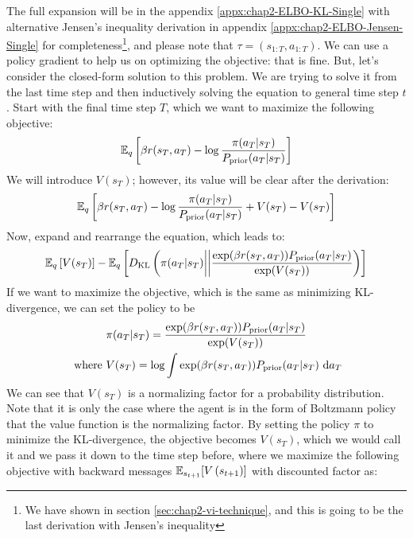 The full expansion will be in the appendix \ref{appx:chap2-ELBO-KL-Single} with alternative Jensen's inequality derivation in appendix \ref{appx:chap2-ELBO-Jensen-Single} for completeness\footnote{We have shown in section \ref{sec:chap2-vi-technique}, and this is going to be the last derivation with Jensen's inequality}, and please note that $\tau = (s_{1:T}, a_{1:T})$. We can use a policy gradient to help us on optimizing the objective: that is fine. But, let's consider the closed-form solution to this problem. We are trying to solve it from the last time step and then inductively solving the equation to general time step $t$. Start with the final time step $T$, which we want to maximize the following objective:
\begin{equation}
    \mathbb{E}_{q} \left[\beta r(s_T, a_T) - \log \frac{\pi(a_T | s_T)}{P_{\text{prior}}(a_T | s_T)}\right]
\end{equation}
We will introduce $V(s_T)$; however, its value will be clear after the derivation: 
\begin{equation}
    \mathbb{E}_{q} \left[\beta r(s_T, a_T) - \log \frac{\pi(a_T | s_T)}{P_{\text{prior}}(a_T | s_T)} + V(s_T) - V(s_T) \right]
\end{equation}
Now, expand and rearrange the equation, which leads to:
\begin{equation}
    \mathbb{E}_q \left[ V(s_T) \right] - \mathbb{E}_q \left[ D_{\mathrm{KL}}\left( \pi(a_T | s_T) \bigg|\bigg| \frac{\exp(\beta r(s_T, a_T)) P_{\text{prior}}(a_T | s_T)}{\exp(V(s_T))} \right) \right]
\end{equation}
If we want to maximize the objective, which is the same as minimizing KL-divergence, we can set the policy to be 
\begin{equation}
    \label{eqn:chap2-soln-policy-terminal}
\begin{aligned}
    &\pi(a_T | s_T) = \frac{\exp(\beta r(s_T, a_T)) P_{\text{prior}}(a_T | s_T)}{\exp(V(s_T))} \\
    \text{ where }& V(s_T) = \log \int \exp(\beta r(s_T, a_T)) P_{\text{prior}}(a_T | s_T) \ \mathrm{d} a_T
\end{aligned}
\end{equation}
We can see that $V(s_T)$ is a normalizing factor for a probability distribution. Note that it is only the case where the agent is in the form of Boltzmann policy that the value function is the normalizing factor. By setting the policy $\pi$ to minimize the KL-divergence, the objective becomes $V(s_T)$, which we would call it  and we pass it down to the time step before, where we maximize the following objective with backward messages $\mathbb{E}_{s_{t+1}}[V\left( s_{t+1} \right)]$ with discounted factor as:
